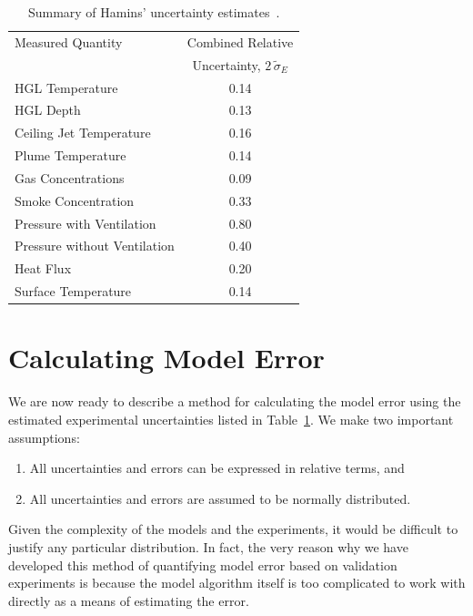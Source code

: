 \begin{table}[t]
\caption{Summary of Hamins' uncertainty estimates~\cite{NUREG_1824}. }
\begin{center}
\begin{tabular}{|l|c|}
\hline
Measured Quantity               & Combined Relative       \\
                                & Uncertainty, $2 \, \widetilde{\sigma}_E$       \\ \hline \hline
HGL Temperature                 & 0.14    \\ \hline
HGL Depth                       & 0.13    \\ \hline
Ceiling Jet Temperature         & 0.16    \\ \hline
Plume Temperature               & 0.14    \\ \hline
Gas Concentrations              & 0.09     \\ \hline
Smoke Concentration             & 0.33    \\ \hline
Pressure with Ventilation       & 0.80    \\ \hline
Pressure without Ventilation    & 0.40    \\ \hline
Heat Flux                       & 0.20    \\ \hline
Surface Temperature             & 0.14    \\ \hline
\end{tabular}
\end{center}
\label{Uncertainty}
\end{table}


\section{Calculating Model Error}

We are now ready to describe a method for calculating the model error using the estimated experimental uncertainties
listed in Table~\ref{Uncertainty}.
We make two important assumptions:
\begin{enumerate}
\item All uncertainties and errors can be expressed in relative terms, and
\item All uncertainties and errors are assumed to be normally distributed.
\end{enumerate}
Given the complexity of the models and the experiments, it would be difficult to justify
any particular distribution. In fact, the very reason why we have developed this method of quantifying model error based on validation
experiments is because the model algorithm itself is too complicated to work with directly as a means of estimating the error.

